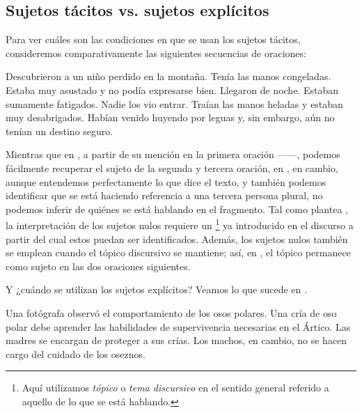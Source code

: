 \subsection{Sujetos tácitos vs. sujetos explícitos}\label{sec:06-explicitos}

Para ver cuáles son las condiciones en que se usan los sujetos tácitos,
consideremos comparativamente las siguientes secuencias de oraciones:

\begin{exe}
  \ex\label{ex:06-nino} Descubrieron a un niño perdido en la montaña. Tenía las
      manos congeladas. Estaba muy asustado y no podía expresarse bien.
  \ex\label{ex:06-llegaron} Llegaron de noche. Estaban sumamente fatigados. Nadie
      los vio entrar. Traían las manos heladas y estaban muy desabrigados.
      Habían venido huyendo por leguas y, sin embargo, aún no tenían un destino
      seguro.
\end{exe}

Mientras que en , a partir de su mención en la primera
oración ------, podemos fácilmente
recuperar el sujeto de la segunda y tercera oración, en ,
en cambio, aunque entendemos perfectamente lo que dice el texto, y también
podemos identificar que se está haciendo referencia a una tercera persona
plural, no podemos inferir de quiénes se está hablando en el fragmento. Tal como
plantea \textcite{camacho2018}, la interpretación de los sujetos nulos requiere
un \footnote{Aquí utilizamos \textit{tópico} o \textit{tema
discursivo} en el sentido general referido a aquello de lo que se está
hablando.} ya introducido en el discurso a partir del cual estos puedan ser
identificados. Además, los sujetos nulos también se emplean cuando el tópico
discursivo se mantiene; así, en , el tópico  permanece como sujeto en las dos oraciones siguientes.

Y ¿cuándo se utilizan los sujetos explícitos? Veamos lo que sucede en
.

\begin{exe}
  \ex\label{ex:06-osos} Una fotógrafa observó el comportamiento de los osos
      polares. Una cría de oso polar debe aprender las habilidades de
      supervivencia necesarias en el Ártico. Las madres se encargan de proteger
      a sus crías. Los machos, en cambio, no se hacen cargo del cuidado de los
      oseznos.
\end{exe}

